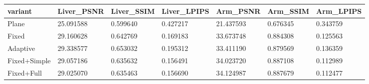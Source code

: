 \begin{tabular}{lllllll}
variant & Liver\_PSNR & Liver\_SSIM & Liver\_LPIPS & Arm\_PSNR & Arm\_SSIM & Arm\_LPIPS \\
\hline
Plane & 25.091588 & 0.599640 & 0.427217 & 21.437593 & 0.676345 & 0.343759 \\
Fixed & 29.160628 & 0.642769 & 0.169183 & 33.673748 & 0.884308 & 0.125563 \\
Adaptive & 29.338577 & 0.653032 & 0.195312 & 33.411190 & 0.879569 & 0.136359 \\
Fixed+Simple & 29.057186 & 0.635632 & 0.156491 & 34.023720 & 0.887108 & 0.112989 \\
Fixed+Full & 29.025070 & 0.635463 & 0.156690 & 34.124987 & 0.887679 & 0.112477 \\
\end{tabular}
